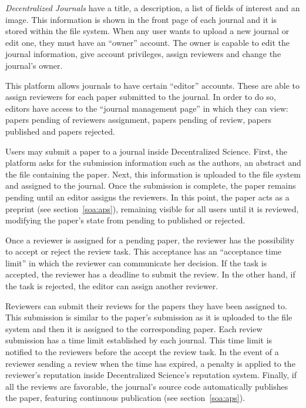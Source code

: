 \emph{Decentralized Journals} have a title, a description, a list of fields of
interest and an image. This information is shown in the front page of each
journal and it is stored within the file system. When any user wants to upload a
new journal or edit one, they must have an ``owner'' account. The owner is
capable to edit the journal information, give account privileges, assign
reviewers and change the journal's owner.

\label{cha:platform-description-5}

This platform allows journals to have certain ``editor'' accounts. These are
able to assign reviewers for each paper submitted to the journal. In order to do
so, editors have access to the ``journal management page'' in which they can
view: papers pending of reviewers assignment, papers pending of review, papers
published and papers rejected.

\label{cha:platform-description-4}

Users may submit a paper to a journal inside Decentralized Science. First, the
platform asks for the submission information such as the authors, an abstract
and the file containing the paper. Next, this information is uploaded to the
file system and assigned to the journal. Once the submission is complete, the
paper remains pending until an editor assigns the reviewers. In this point, the
paper acts as a preprint (see section~\ref{soa:aps}), remaining visible for all
users until it is reviewed, modifying the paper's state from pending to
published or rejected.

\label{cha:platform-description-3}

Once a reviewer is assigned for a pending paper, the reviewer has the
possibility to accept or reject the review task. This acceptance has an
``acceptance time limit'' in which the reviewer can communicate her decision. If
the task is accepted, the reviewer has a deadline to submit the review. In the
other hand, if the task is rejected, the editor can assign another reviewer.

\label{cha:platform-description-2}

Reviewers can submit their reviews for the papers they have been assigned to.
This submission is similar to the paper's submission as it is uploaded to the
file system and then it is assigned to the corresponding paper. Each review
submission has a time limit established by each journal. This time limit is
notified to the reviewers before the accept the review task. In the event of a
reviewer sending a review when the time has expired, a penalty is applied to the
reviewer's reputation inside Decentralized Science's reputation system. Finally,
if all the reviews are favorable, the journal's source code automatically
publishes the paper, featuring continuous publication (see
section~\ref{soa:aps}).

